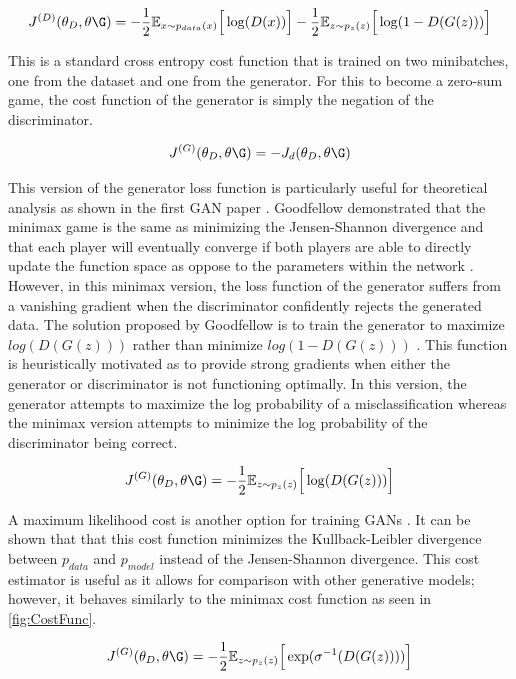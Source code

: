\documentclass[11pt]{article}
\begin{document}
$$J^{(D)}(\theta_D,\theta\G) = -\frac{1}{2}\mathbb{E}_{x\sim p_{data}(x)}\Big[\log(D(x))\Big] - \frac{1}{2}\mathbb{E}_{z\sim p_{z}(z)}\Big[\log(1-D(G(z)))\Big]$$

This is a standard cross entropy cost function that is trained on two minibatches, one from the dataset and one from the generator. For this to become a zero-sum game, the cost function of the generator is simply the negation of the discriminator.

$$J^{(G)}(\theta_D,\theta\G) = -J_d(\theta_D,\theta\G)$$

This version of the generator loss function is particularly useful for theoretical analysis as shown in the first GAN paper \citep{2014arXiv1406.2661G}. Goodfellow demonstrated that the minimax game is the same as minimizing the Jensen-Shannon divergence and that each player will eventually converge if both players are able to directly update the function space as oppose to the parameters within the network \citep{2017arXiv170100160G}. However, in this minimax version, the loss function of the generator suffers from a vanishing gradient when the discriminator confidently rejects the generated data. The solution proposed by Goodfellow is to train the generator to maximize $log(D(G(z)))$ rather than minimize $log(1-D(G(z)))$ \citep{2014arXiv1406.2661G}. This function is heuristically motivated as to provide strong gradients when either the generator or discriminator is not functioning optimally. In this version, the generator attempts to maximize the log probability of a misclassification whereas the minimax version attempts to minimize the log probability of the discriminator being correct.

$$J^{(G)}(\theta_D,\theta\G) = -\frac{1}{2}\mathbb{E}_{z\sim p_{z}(z)}\Big[\log(D(G(z)))\Big]$$

A maximum likelihood cost is another option for training GANs \citep{2017arXiv170100160G}. It can be shown that that this cost function minimizes the Kullback-Leibler divergence between $p_{data}$ and $p_{model}$ instead of the Jensen-Shannon divergence. This cost estimator is useful as it allows for comparison with other generative models; however, it behaves similarly to the minimax cost function as seen in \ref{fig:CostFunc}.

$$J^{(G)}(\theta_D,\theta\G) = -\frac{1}{2}\mathbb{E}_{z\sim p_{z}(z)}\Big[\exp(\sigma^{-1}(D(G(z))))\Big]$$
\end{document}
